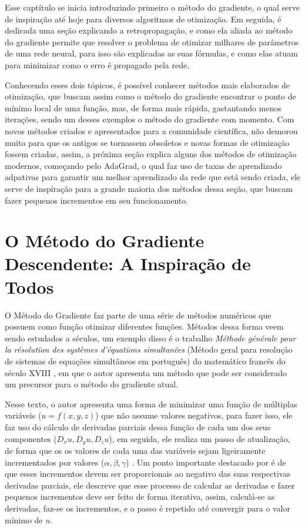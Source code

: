 Esse captítulo se inicia introduzindo primeiro o método do gradiente, o qual serve de inspiração até hoje para diversos algoritmos de otimização. Em seguida, é dedicada uma seção explicando a retropropagação, e como ela aliada ao método do gradiente permite que resolver o problema de otimizar milhares de parâmetros de uma rede neural, para isso são explicadas as suas fórmulas, e como elas atuam para minimizar como o erro é propagado pela rede. 

Conhecendo esses dois tópicos, é possível conhecer métodos mais elaborados de otimização, que buscam assim como o método do gradiente encontrar o ponto de mínimo local de uma função, mas, de forma mais rápida, gastantando menos iterações, sendo um desses exemplos o método do gradiente com momento. Com novos métodos criados e apresentados para a comunidade científica, não demorou muito para que os antigos se tornassem obsoletos e novas formas de otimização fossem criadas, assim, a próxima seção explica alguns dos métodos de otimização modernos, começando pelo AdaGrad, o qual faz uso de taxas de aprendizado adpativas para garantir um melhor aprendizado da rede que está sendo criada, ele serve de inspiração para a grande maioria dos métodos dessa seção, que buscam fazer pequenos incrementos em seu funcionamento.


\section{O Método do Gradiente Descendente: A Inspiração de Todos}

O Método do Gradiente faz parte de uma série de métodos numéricos que possuem como função otimizar diferentes funções. Métodos dessa forma veem sendo estudados a séculos, um exemplo disso é o trabalho \textit{M{\'e}thode g{\'e}n{\'e}rale pour la r{\'e}solution des syst{\`e}mes d'{\'e}quations simultan{\'e}es} (Método geral para resolução de sistemas de equações simultâneos em português) do matemático francês do século XVIII \textcite{CauchyMetodoDoGradiente}, em que o autor apresenta um método que pode ser considerado um precursor para o método do gradiente atual.

Nesse texto, o autor apresenta uma forma de minimizar uma função de múltiplas variáveis ($u=f(x,y,z)$) que não assume valores negativos, para fazer isso, ele faz uso do cálculo de derivadas parciais dessa função de cada um dos seus componentes ($D_x u, D_y u, D_z u$), em seguida, ele realiza um passo de atualização, de forma que os os valores de cada uma das variáveis sejam ligeiramente incrementados por valores ($\alpha, \beta, \gamma$) \parencite{CauchyMetodoDoGradiente}. Um ponto importante destacado por \textcite{CauchyMetodoDoGradiente} é de que esses incrementos devem ser proporcionais ao negativo das suas respectivas derivadas parciais, ele descreve que esse processo de calcular as derivadas e fazer pequenos incrementos deve ser feito de forma iterativa, assim, calculá-se as derivadas, faz-se os incrementos, e o passo é repetido até convergir para o valor mínimo de $u$.

